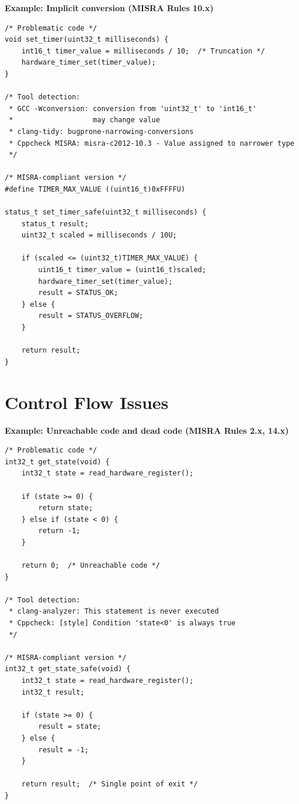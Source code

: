 \documentclass[11pt,letterpaper]{report}
\begin{document}
\textbf{Example: Implicit conversion (MISRA Rules 10.x)}

\begin{lstlisting}[style=cstyle]
/* Problematic code */
void set_timer(uint32_t milliseconds) {
    int16_t timer_value = milliseconds / 10;  /* Truncation */
    hardware_timer_set(timer_value);
}

/* Tool detection:
 * GCC -Wconversion: conversion from 'uint32_t' to 'int16_t'
 *                   may change value
 * clang-tidy: bugprone-narrowing-conversions
 * Cppcheck MISRA: misra-c2012-10.3 - Value assigned to narrower type
 */

/* MISRA-compliant version */
#define TIMER_MAX_VALUE ((uint16_t)0xFFFFU)

status_t set_timer_safe(uint32_t milliseconds) {
    status_t result;
    uint32_t scaled = milliseconds / 10U;

    if (scaled <= (uint32_t)TIMER_MAX_VALUE) {
        uint16_t timer_value = (uint16_t)scaled;
        hardware_timer_set(timer_value);
        result = STATUS_OK;
    } else {
        result = STATUS_OVERFLOW;
    }

    return result;
}
\end{lstlisting}

\section{Control Flow Issues}

\textbf{Example: Unreachable code and dead code (MISRA Rules 2.x, 14.x)}

\begin{lstlisting}[style=cstyle]
/* Problematic code */
int32_t get_state(void) {
    int32_t state = read_hardware_register();

    if (state >= 0) {
        return state;
    } else if (state < 0) {
        return -1;
    }

    return 0;  /* Unreachable code */
}

/* Tool detection:
 * clang-analyzer: This statement is never executed
 * Cppcheck: [style] Condition 'state<0' is always true
 */

/* MISRA-compliant version */
int32_t get_state_safe(void) {
    int32_t state = read_hardware_register();
    int32_t result;

    if (state >= 0) {
        result = state;
    } else {
        result = -1;
    }

    return result;  /* Single point of exit */
}
\end{lstlisting}
\end{document}
